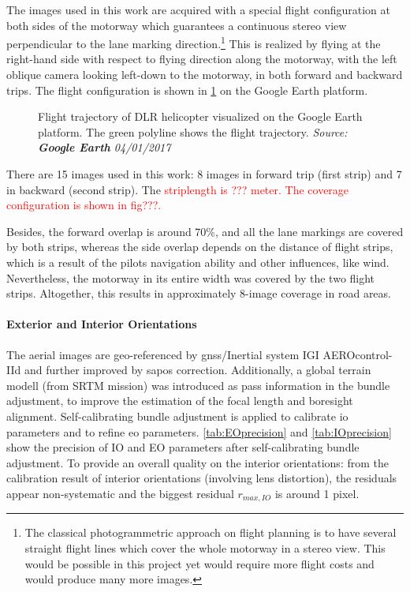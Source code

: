 The images used in this work are acquired with a special flight configuration at both sides of the motorway which guarantees a continuous stereo view perpendicular to the lane marking direction.\footnote{The classical photogrammetric approach on flight planning is to have several straight flight lines which cover the whole motorway in a stereo view. This would be possible in this project yet would require more flight costs and would produce many more images.} This is realized by flying at the right-hand side with respect to flying direction along the motorway, with the left oblique camera looking left-down to the motorway, in both forward and backward trips. The flight configuration is shown in \cref{fig:FlightTrajectory} on the Google Earth platform.

\begin{figure}%
	\centering
	\caption{\small Flight trajectory of DLR helicopter visualized on the Google Earth platform. The green polyline shows the flight trajectory. \textit{Source: \textbf{Google Earth} 04/01/2017}}
	\label{fig:FlightTrajectory}
\end{figure}

\clearpage
There are 15 images used in this work: 8 images in forward trip (first strip) and 7 in backward (second strip). The \textcolor{red}{striplength is ??? meter. The coverage configuration is shown in fig???.}

Besides, the forward overlap is around 70\%, and all the lane markings are covered by both strips, whereas the side overlap depends on the distance of flight strips, which is a result of the pilots navigation ability and other influences, like wind. Nevertheless, the motorway in its entire width was covered by the two flight strips. Altogether, this results in approximately 8-image coverage in road areas. 


\paragraph{Exterior and Interior Orientations}
The aerial images are geo-referenced by \gls{gnss}/Inertial system IGI AEROcontrol-IId and further improved by \gls{sapos} correction. Additionally, a global terrain modell (from SRTM mission) was introduced as pass information in the bundle adjustment, to improve the estimation of the focal length and boresight alignment. Self-calibrating bundle adjustment is applied to calibrate \gls{io} parameters and to refine \gls{eo} parameters. \cref{tab:EOprecision} and \cref{tab:IOprecision} show the precision of IO and EO parameters after self-calibrating bundle adjustment. %
To provide an overall quality on the interior orientations: from the calibration result of interior orientations (involving lens distortion), the residuals appear non-systematic and the biggest residual $r_{max, IO}$ is around 1 pixel.%

